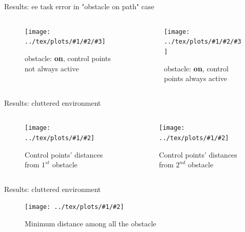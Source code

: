 \documentclass[11pt]{beamer}
\newcommand{\imgG}[3]{\texttt{[image: ../tex/plots/\#1/\#2]}}
\newcommand{\img}[4]{\texttt{[image: ../tex/plots/\#1/\#2/\#3]}}
\begin{document}
\begin{frame}{Results: ee task error in "obstacle on path" case}
\begin{columns}
\begin{column}{.5\textwidth}
\begin{figure}[H]
\img{on}{notAlways}{ee_task_error.eps}{.4}
\caption{obstacle: \textbf{on}, control points not always active}
\end{figure}
\end{column}
\begin{column}{.5\textwidth}
\begin{figure}[H]
\img{on}{always}{ee_task_error.eps}{.4}
\caption{obstacle: \textbf{on}, control points always active}
\end{figure}
\end{column}
\end{columns}
\end{frame}

\begin{frame}{Results: cluttered environment}
\begin{columns}
\begin{column}{.5\textwidth}
\begin{figure}[H]
\label{3obstDist}
\imgG{2obs}{control_points_distances.eps}{.4}
\caption{Control points' distances from $1^{st}$ obstacle}
\end{figure}
\end{column}
\begin{column}{.5\textwidth}
\begin{figure}[H]
\imgG{2obs}{control_points_distances_2.eps}{.4}
\caption{Control points' distances from $2^{nd}$ obstacle}
\end{figure}
\end{column}
\end{columns}
\end{frame}

\begin{frame}{Results: cluttered environment}
\begin{figure}[H]
\imgG{2obs}{min_2.eps}{.5}
\caption{Minimum distance among all the obstacle}
\end{figure}
\end{frame}
\end{document}
